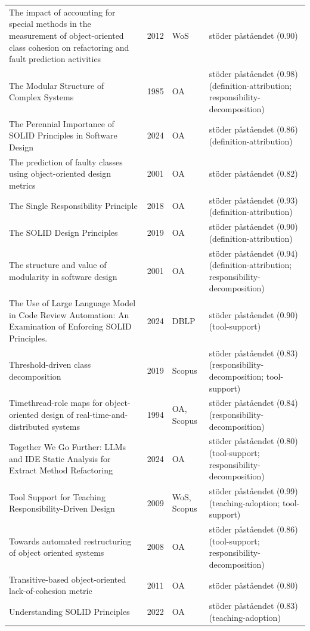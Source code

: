 \begin{longtable}{@{}%
  >{\raggedright\arraybackslash}p{}c%
  >{\raggedright\arraybackslash}p{}%
  >{\raggedright\arraybackslash}p{}@{}}
The impact of accounting for special methods in the measurement of object-oriented class cohesion on refactoring and fault prediction activities & 2012 & WoS & stöder påståendet (0.90) \\
The Modular Structure of Complex Systems & 1985 & OA & stöder påståendet (0.98) (definition-attribution; responsibility-decomposition) \\
The Perennial Importance of SOLID Principles in Software Design & 2024 & OA & stöder påståendet (0.86) (definition-attribution) \\
The prediction of faulty classes using object-oriented design metrics & 2001 & OA & stöder påståendet (0.82) \\
The Single Responsibility Principle & 2018 & OA & stöder påståendet (0.93) (definition-attribution) \\
The SOLID Design Principles & 2019 & OA & stöder påståendet (0.90) (definition-attribution) \\
The structure and value of modularity in software design & 2001 & OA & stöder påståendet (0.94) (definition-attribution; responsibility-decomposition) \\
The Use of Large Language Model in Code Review Automation: An Examination of Enforcing SOLID Principles. & 2024 & DBLP & stöder påståendet (0.90) (tool-support) \\
Threshold-driven class decomposition & 2019 & Scopus & stöder påståendet (0.83) (responsibility-decomposition; tool-support) \\
Timethread-role maps for object-oriented design of real-time-and-distributed systems & 1994 & OA, Scopus & stöder påståendet (0.84) (responsibility-decomposition) \\
Together We Go Further: LLMs and IDE Static Analysis for Extract Method Refactoring & 2024 & OA & stöder påståendet (0.80) (tool-support; responsibility-decomposition) \\
Tool Support for Teaching Responsibility-Driven Design & 2009 & WoS, Scopus & stöder påståendet (0.99) (teaching-adoption; tool-support) \\
Towards automated restructuring of object oriented systems & 2008 & OA & stöder påståendet (0.86) (tool-support; responsibility-decomposition) \\
Transitive-based object-oriented lack-of-cohesion metric & 2011 & OA & stöder påståendet (0.80) \\
Understanding SOLID Principles & 2022 & OA & stöder påståendet (0.83) (teaching-adoption) \\

\end{longtable}

